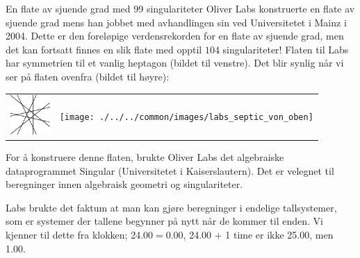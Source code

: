 \begin{surferPage}[99 singulariteter]{En flate av sjuende grad med 99 singulariteter}
	Oliver Labs konstruerte en flate av sjuende grad mens han jobbet med avhandlingen sin 
	ved Universitetet i Mainz i 2004. Dette er den foreløpige verdensrekorden for en flate av sjuende 
	grad, men det kan fortsatt finnes en slik flate med opptil $104$ singulariteter! Flaten til Labs har 
	symmetrien til et vanlig heptagon (bildet til venstre). Det blir synlig når vi ser på flaten ovenfra (bildet til høyre):
	
    \vspace*{-0.3em}
    \begin{center}
      \begin{tabular}{c@{\qquad}c}
        \includegraphics[height=1.5cm]{./../../common/images/labsseptic1.pdf}
        &
        \texttt{[image: ./../../common/images/labs\_septic\_von\_oben]}
      \end{tabular}
    \end{center}
    \vspace*{-0.3em}
	
	For å konstruere denne flaten, brukte Oliver Labs det algebraiske dataprogrammet {\sc Singular} 
	(Universitetet i Kaiserslautern). Det er velegnet til beregninger innen algebraisk geometri og singulariteter. 

	Labs brukte det faktum at man kan gjøre beregninger i endelige tallsystemer, som er systemer der tallene begynner 
	på nytt når de kommer til enden. Vi kjenner til dette fra klokken; 24.00$=$0.00, 24.00 $+$ 1 time er ikke 25.00, men 1.00.
\end{surferPage}
